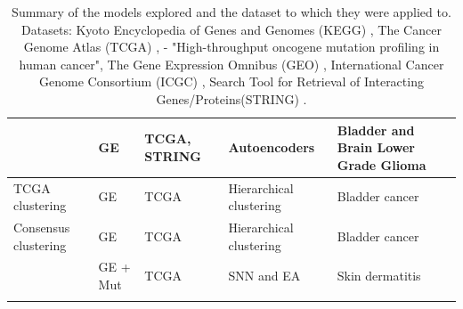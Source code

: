 {\begin{longtable}{|p{3cm}|p{1.8cm}|p{2.2cm}|p{2.8cm}|p{3.5cm}|}
\citet{Ma2019-hk} & GE & TCGA, STRING & Autoencoders &  Bladder and Brain Lower Grade Glioma \\ \hline
TCGA clustering & GE & TCGA & Hierarchical clustering & Bladder cancer  \\ \hline
Consensus clustering & GE & TCGA & Hierarchical clustering & Bladder cancer \\ \hline
\citet{Capecci2020-uj} & GE + Mut & TCGA & SNN and EA & Skin dermatitis  \\ \hline
\caption[Summary of the models explored and the datasets used]{Summary of the models explored and the dataset to which they were applied to. Datasets: Kyoto Encyclopedia of Genes and Genomes (KEGG) \cite{Kanehisa2017-wj}, The Cancer Genome Atlas (TCGA) \cite{Tcga2018-sj}, \citet{Thomas2007-yj} - "High-throughput oncogene mutation profiling in human cancer", The Gene Expression Omnibus (GEO) \cite{Clough2016-zc, Davis2007-at}, International Cancer Genome Consortium (ICGC) \cite{International_Cancer_Genome_Consortium2010-ca}, Search Tool for Retrieval of Interacting Genes/Proteins(STRING) \cite{Szklarczyk2019-pu}.}
\label{tab:approaches}
\end{longtable}
}









